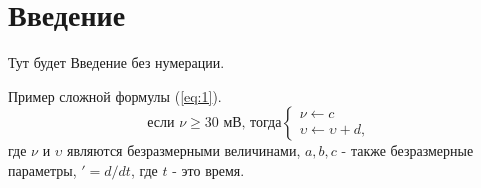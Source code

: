 \documentclass[russian, utf8, columnxxvi]{eskdtext}
\let\stdsection\section
\renewcommand\section{\newpage\stdsection}
\begin{document}
\thispagestyle{empty}

\thispagestyle{empty}


\setcounter{secnumdepth}{4}
\thispagestyle{empty}

\setcounter{page}{4}


\begin{center}
   \tableofcontents 
\end{center}

\section*{Введение}
Тут будет Введение без нумерации.

Пример сложной формулы (\ref{eq:1}).
\begin{equation}
    \label{eq:1}
    \text{если } \nu \geq \text{30 мВ, тогда} 
    \begin{cases}
        \nu \gets c\\
        \upsilon \gets \upsilon + d,
 \end{cases}   
\end{equation}
где $\nu$ и $\upsilon$ являются безразмерными величинами, $a, b, c$ - также безразмерные параметры, $' = d/dt$, где $t$ - это время.
\end{document}
